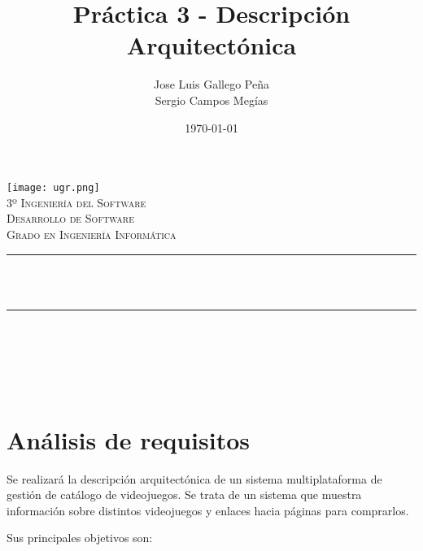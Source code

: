 \documentclass[11pt, spanish]{article}
\title{Práctica 3 - Descripción Arquitectónica\hspace{0.05cm}}
\author{Jose Luis Gallego Peña\\Sergio Campos Megías}
\date{\today}
\makeatletter
\let\thetitle\@title
\let\theauthor\@author
\let\thedate\@date
\makeatother
\begin{document}

\begin{titlepage}
    \centering
    \vspace*{0.1 cm}
    \texttt{[image: ugr.png]}\\[0.5 cm]
    \textsc{\large 3º Ingeniería del Software}\\[0.5 cm]        
    \textsc{\large Desarrollo de Software}\\[0.5 cm]       
    \textsc{\large Grado en Ingeniería Informática}\\[0.5 cm]              
    \rule{\linewidth}{0.2 mm} \\[0.2 cm]
    { \huge \bfseries \thetitle}\\
    \rule{\linewidth}{0.2 mm} \\[1.5 cm]
    	
    \begin{minipage}{1\textwidth}
        \begin{center} \large
            \theauthor
        \end{center}
    \end{minipage}~
    
    \vspace{2cm}
    {\large \thedate}\\[1 cm]
 	
    \vfill
    
\end{titlepage}


\tableofcontents
\pagebreak

\section{Análisis de requisitos}

Se realizará la descripción arquitectónica de un sistema multiplataforma de gestión de catálogo de videojuegos. Se trata de un sistema que muestra información sobre distintos videojuegos y enlaces hacia páginas para comprarlos.

Sus principales objetivos son:
\end{document}
